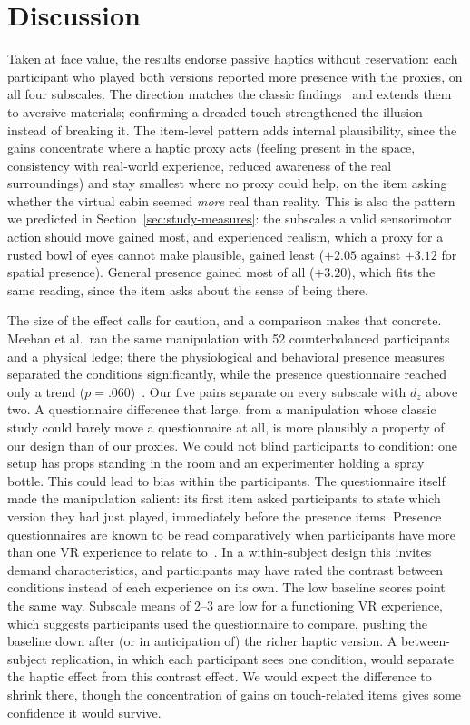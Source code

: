 
\section{Discussion}
\label{sec:discussion}

Taken at face value, the results endorse passive haptics without reservation: each participant who played both versions reported more presence with the proxies, on all four subscales. The direction matches the classic findings~\cite{Hoffman.1998, Insko.2001,Meehan.2002} and extends them to aversive materials; confirming a dreaded touch strengthened the illusion instead of breaking it. The item-level pattern adds internal plausibility, since the gains concentrate where a haptic proxy acts (feeling present in the space, consistency with real-world experience, reduced awareness of the real surroundings) and stay smallest where no proxy could help, on the item asking whether the virtual cabin seemed \emph{more} real than reality. This is also the pattern we predicted in Section~\ref{sec:study-measures}: the subscales a valid sensorimotor action should move gained most, and experienced realism, which a proxy for a rusted bowl of eyes cannot make plausible, gained least ($+2.05$ against $+3.12$ for spatial presence). General presence gained most of all ($+3.20$), which fits the same reading, since the item asks about the sense of being there.


The size of the effect calls for caution, and a comparison makes that concrete. Meehan et al.\ ran the same manipulation with 52 counterbalanced participants and a physical ledge; there the physiological and behavioral presence measures separated the conditions significantly, while the presence questionnaire reached only a trend ($p = .060$)~\cite{Meehan.2002}. Our five pairs separate on every subscale with $d_z$ above two. A questionnaire difference that large, from a manipulation whose classic study could barely move a questionnaire at all, is more plausibly a property of our design than of our proxies. We could not blind participants to condition: one setup has props standing in the room and an experimenter holding a spray bottle. This could lead to bias within the participants. The questionnaire itself made the manipulation salient: its first item asked participants to state which version they had just played, immediately before the presence items. Presence questionnaires are known to be read comparatively when participants have more than one VR experience to relate to~\cite{Schwind.2019, Graf.2020}. In a within-subject design this invites demand characteristics, and participants may have rated the contrast between conditions instead of each experience on its own. The low baseline scores point the same way. Subscale means of 2--3 are low for a functioning VR experience, which suggests participants used the questionnaire to compare, pushing the baseline down after (or in anticipation of) the richer haptic version. A between-subject replication, in which each participant sees one condition, would separate the haptic effect from this contrast effect. We would expect the difference to shrink there, though the concentration of gains on touch-related items gives some confidence it would survive.

